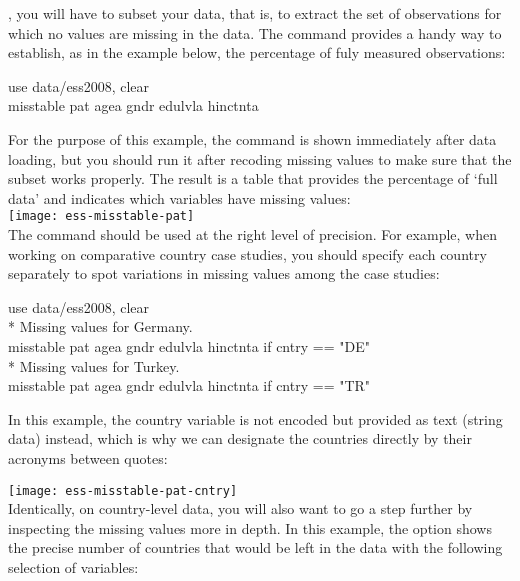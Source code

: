 , you will have to subset your data, that is, to extract the set of observations for which no values are missing in the data. The  command provides a handy way to establish, as in the \ESS example below, the percentage of fuly measured observations:

	\begin{docspec}
		use data/ess2008, clear\\
		misstable pat agea gndr edulvla hinctnta
	\end{docspec}
	
	For the purpose of this example, the  command is shown immediately after data loading, but you should run it after recoding missing values to make sure that the subset works properly. The result is a table that provides the percentage of `full data' and indicates which variables have missing values:\\[1em]
	
	\texttt{[image: ess-misstable-pat]}\\[1em]

	The  command should be used at the right level of precision. For example, when working on comparative country case studies, you should specify each country separately to spot variations in missing values among the case studies:\\[1em]
	
	\begin{docspec}
		use data/ess2008, clear\\[1em]%
		* Missing values for Germany.\\%
		misstable pat agea gndr edulvla hinctnta if cntry == "DE"\\[1em]%
		* Missing values for Turkey.\\%
		misstable pat agea gndr edulvla hinctnta if cntry == "TR"
	\end{docspec}

	In this example, the country variable is not encoded but provided as text (string data) instead, which is why we can designate the countries directly by their acronyms between quotes:

	\texttt{[image: ess-misstable-pat-cntry]}\\[1em]
	
	Identically, on country-level data, you will also want to go a step further by inspecting the missing values more in depth. In this example, the  option shows the precise number of countries that would be left in the data with the following selection of variables:\\[1em]
	
